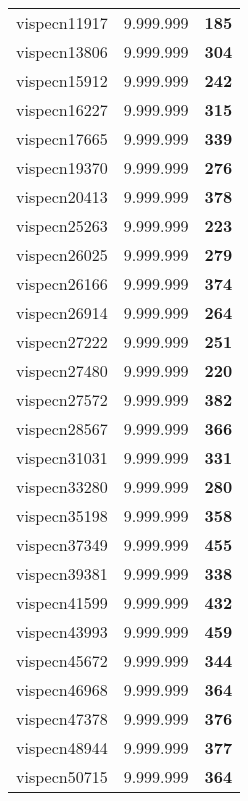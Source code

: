 \begin{tabular}{cc||c}
vispecn11917     & 9.999.999        & {\bf 185}       \\ 
vispecn13806     & 9.999.999        & {\bf 304}       \\ 
vispecn15912     & 9.999.999        & {\bf 242}       \\ 
vispecn16227     & 9.999.999        & {\bf 315}       \\ 
vispecn17665     & 9.999.999        & {\bf 339}       \\ 
vispecn19370     & 9.999.999        & {\bf 276}       \\ 
vispecn20413     & 9.999.999        & {\bf 378}       \\ 
vispecn25263     & 9.999.999        & {\bf 223}       \\ 
vispecn26025     & 9.999.999        & {\bf 279}       \\ 
vispecn26166     & 9.999.999        & {\bf 374}       \\ 
vispecn26914     & 9.999.999        & {\bf 264}       \\ 
vispecn27222     & 9.999.999        & {\bf 251}       \\ 
vispecn27480     & 9.999.999        & {\bf 220}       \\ 
vispecn27572     & 9.999.999        & {\bf 382}       \\ 
vispecn28567     & 9.999.999        & {\bf 366}       \\ 
vispecn31031     & 9.999.999        & {\bf 331}       \\ 
vispecn33280     & 9.999.999        & {\bf 280}       \\ 
vispecn35198     & 9.999.999        & {\bf 358}       \\ 
vispecn37349     & 9.999.999        & {\bf 455}       \\ 
vispecn39381     & 9.999.999        & {\bf 338}       \\ 
vispecn41599     & 9.999.999        & {\bf 432}       \\ 
vispecn43993     & 9.999.999        & {\bf 459}       \\ 
vispecn45672     & 9.999.999        & {\bf 344}       \\ 
vispecn46968     & 9.999.999        & {\bf 364}       \\ 
vispecn47378     & 9.999.999        & {\bf 376}       \\ 
vispecn48944     & 9.999.999        & {\bf 377}       \\ 
vispecn50715     & 9.999.999        & {\bf 364}       \\ 

\end{tabular}

